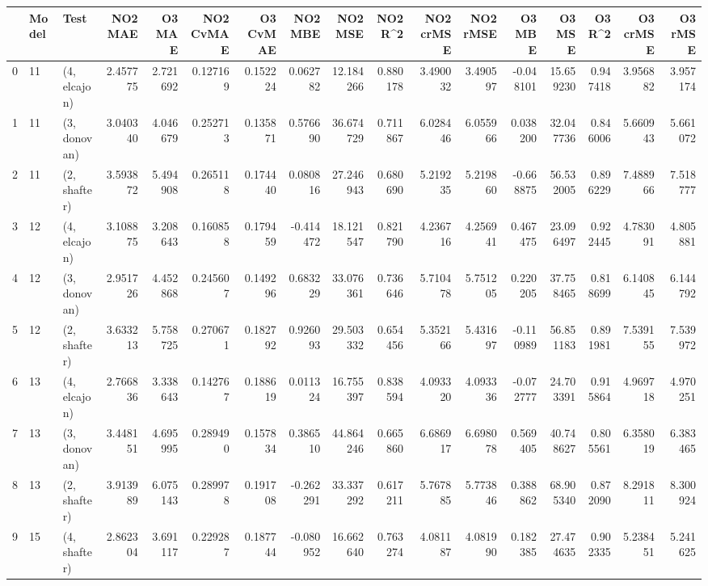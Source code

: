 \begin{tabular}{lllrrrrrrrrrrrrrr}
\toprule
{} & Model &          Test &   NO2 MAE &    O3 MAE &  NO2 CvMAE &  O3 CvMAE &   NO2 MBE &    NO2 MSE &   NO2 R\textasciicircum2 &  NO2 crMSE &  NO2 rMSE &    O3 MBE &      O3 MSE &    O3 R\textasciicircum2 &   O3 crMSE &    O3 rMSE \\
\midrule
0  &    11 &  (4, elcajon) &  2.457775 &  2.721692 &   0.127169 &  0.152224 &  0.062782 &  12.184266 &  0.880178 &   3.490032 &  3.490597 & -0.048101 &   15.659230 &  0.947418 &   3.956882 &   3.957174 \\
1  &    11 &  (3, donovan) &  3.040340 &  4.046679 &   0.252713 &  0.135871 &  0.576690 &  36.674729 &  0.711867 &   6.028446 &  6.055966 &  0.038200 &   32.047736 &  0.846006 &   5.660943 &   5.661072 \\
2  &    11 &  (2, shafter) &  3.593872 &  5.494908 &   0.265118 &  0.174440 &  0.080816 &  27.246943 &  0.680690 &   5.219235 &  5.219860 & -0.668875 &   56.532005 &  0.896229 &   7.488966 &   7.518777 \\
3  &    12 &  (4, elcajon) &  3.108875 &  3.208643 &   0.160858 &  0.179459 & -0.414472 &  18.121547 &  0.821790 &   4.236716 &  4.256941 &  0.467475 &   23.096497 &  0.922445 &   4.783091 &   4.805881 \\
4  &    12 &  (3, donovan) &  2.951726 &  4.452868 &   0.245607 &  0.149296 &  0.683229 &  33.076361 &  0.736646 &   5.710478 &  5.751205 &  0.220205 &   37.758465 &  0.818699 &   6.140845 &   6.144792 \\
5  &    12 &  (2, shafter) &  3.633213 &  5.758725 &   0.270671 &  0.182792 &  0.926093 &  29.503332 &  0.654456 &   5.352166 &  5.431697 & -0.110989 &   56.851183 &  0.891981 &   7.539155 &   7.539972 \\
6  &    13 &  (4, elcajon) &  2.766836 &  3.338643 &   0.142767 &  0.188619 &  0.011324 &  16.755397 &  0.838594 &   4.093320 &  4.093336 & -0.072777 &   24.703391 &  0.915864 &   4.969718 &   4.970251 \\
7  &    13 &  (3, donovan) &  3.448151 &  4.695995 &   0.289490 &  0.157834 &  0.386510 &  44.864246 &  0.665860 &   6.686917 &  6.698078 &  0.569405 &   40.748627 &  0.805561 &   6.358019 &   6.383465 \\
8  &    13 &  (2, shafter) &  3.913989 &  6.075143 &   0.289978 &  0.191708 & -0.262291 &  33.337292 &  0.617211 &   5.767885 &  5.773846 &  0.388862 &   68.905340 &  0.872090 &   8.291811 &   8.300924 \\
9  &    15 &  (4, shafter) &  2.862304 &  3.691117 &   0.229287 &  0.187744 & -0.080952 &  16.662640 &  0.763274 &   4.081187 &  4.081990 &  0.182385 &   27.474635 &  0.902335 &   5.238451 &   5.241625 \\

\end{tabular}

